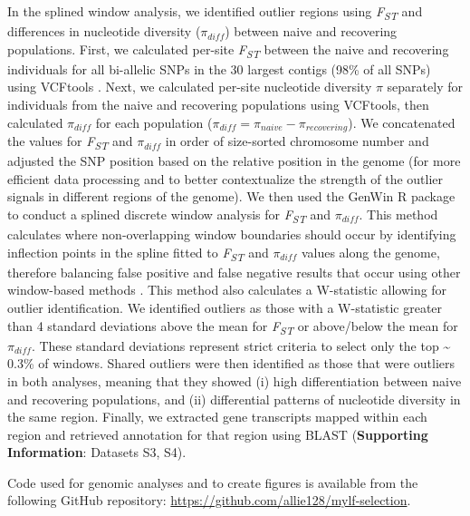 \documentclass[9pt,twocolumn,twoside,lineno]{pnas-new}
\begin{document}
{In the splined window analysis, we identified outlier regions using
\emph{F\textsubscript{ST}} and differences in nucleotide diversity
(\(\pi_{diff}\)) between naive and recovering populations. First, we
calculated per-site \emph{F\textsubscript{ST}} between the naive and
recovering individuals for all bi-allelic SNPs in the 30 largest contigs
(98\% of all SNPs) using VCFtools \citep{danecek2011}. Next, we
calculated per-site nucleotide diversity \(\pi\) separately for
individuals from the naive and recovering populations using VCFtools,
then calculated \(\pi_{diff}\) for each population
(\(\pi_{diff} = \pi_{naive} - \pi_{recovering}\)). We concatenated the
values for \emph{F\textsubscript{ST}} and \(\pi_{diff}\) in order of
size-sorted chromosome number and adjusted the SNP position based on the
relative position in the genome (for more efficient data processing and
to better contextualize the strength of the outlier signals in different
regions of the genome). We then used the GenWin R package
\citep{beissinger2015} to conduct a splined discrete window analysis for
\emph{F\textsubscript{ST}} and \(\pi_{diff}\). This method calculates
where non-overlapping window boundaries should occur by identifying
inflection points in the spline fitted to \emph{F\textsubscript{ST}} and
\(\pi_{diff}\) values along the genome, therefore balancing false
positive and false negative results that occur using other window-based
methods \citep{beissinger2015}. This method also calculates a
W-statistic allowing for outlier identification. We identified outliers
as those with a W-statistic greater than 4 standard deviations above the
mean for \emph{F\textsubscript{ST}} or above/below the mean for
\(\pi_{diff}\). These standard deviations represent strict criteria to
select only the top \textasciitilde{} 0.3\% of windows. Shared outliers
were then identified as those that were outliers in both analyses,
meaning that they showed (i) high differentiation between naive and
recovering populations, and (ii) differential patterns of nucleotide
diversity in the same region. Finally, we extracted gene transcripts
mapped within each region and retrieved annotation for that region using
BLAST (\textbf{Supporting Information}: Datasets S3, S4).

Code used for genomic analyses and to create figures is available from
the following GitHub repository:
\url{https://github.com/allie128/mylf-selection}.

}


\showmatmethods{} %
\end{document}
